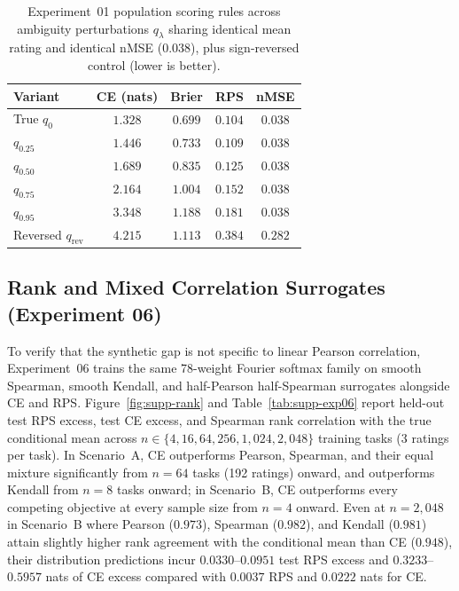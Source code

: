 \begin{table}[htb]
\centering
\caption{Experiment~01 population scoring rules across ambiguity perturbations $q_\lambda$ sharing identical mean rating and identical nMSE ($0.038$), plus sign-reversed control (lower is better).}
\label{tab:supp-exp01}
\small
\setlength{\tabcolsep}{3pt}
\begin{tabular}{@{}lcccc@{}}
\hline
Variant & CE (nats) & Brier & RPS & nMSE \\
\hline
True $q_0$ & $1.328$ & $0.699$ & $0.104$ & $0.038$ \\
$q_{0.25}$ & $1.446$ & $0.733$ & $0.109$ & $0.038$ \\
$q_{0.50}$ & $1.689$ & $0.835$ & $0.125$ & $0.038$ \\
$q_{0.75}$ & $2.164$ & $1.004$ & $0.152$ & $0.038$ \\
$q_{0.95}$ & $3.348$ & $1.188$ & $0.181$ & $0.038$ \\
Reversed $q_{\mathrm{rev}}$ & $4.215$ & $1.113$ & $0.384$ & $0.282$ \\
\hline
\end{tabular}
\end{table}

\subsection{Rank and Mixed Correlation Surrogates (Experiment 06)}
To verify that the synthetic gap is not specific to linear Pearson correlation, Experiment~06 trains the same 78-weight Fourier softmax family on smooth Spearman, smooth Kendall, and half-Pearson half-Spearman surrogates alongside CE and RPS\@.
Figure~\ref{fig:supp-rank} and Table~\ref{tab:supp-exp06} report held-out test RPS excess, test CE excess, and Spearman rank correlation with the true conditional mean across $n \in \{4, 16, 64, 256, 1{,}024, 2{,}048\}$ training tasks (3 ratings per task).
In Scenario~A, CE outperforms Pearson, Spearman, and their equal mixture significantly from $n = 64$ tasks (192 ratings) onward, and outperforms Kendall from $n = 8$ tasks onward; in Scenario~B, CE outperforms every competing objective at every sample size from $n = 4$ onward.
Even at $n=2{,}048$ in Scenario~B where Pearson ($0.973$), Spearman ($0.982$), and Kendall ($0.981$) attain slightly higher rank agreement with the conditional mean than CE ($0.948$), their distribution predictions incur $0.0330$--$0.0951$ test RPS excess and $0.3233$--$0.5957$ nats of CE excess compared with $0.0037$ RPS and $0.0222$ nats for CE\@.

